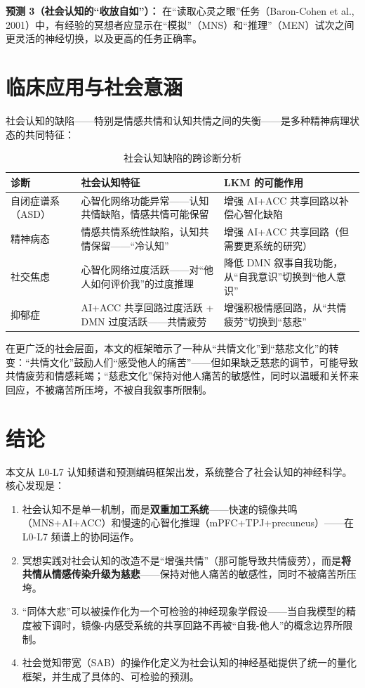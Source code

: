 \documentclass[UTF8,12pt,a4paper]{ctexart}
\begin{document}
\textbf{预测 3（社会认知的``收放自如''）：} 在``读取心灵之眼''任务（Baron-Cohen et al., 2001）中，有经验的冥想者应显示在``模拟''（MNS）和``推理''（MEN）试次之间更灵活的神经切换，以及更高的任务正确率。

\section{临床应用与社会意涵}

社会认知的缺陷——特别是情感共情和认知共情之间的失衡——是多种精神病理状态的共同特征：

\begin{table}[h]
\centering
\caption{社会认知缺陷的跨诊断分析}
\begin{tabular}{p{2.5cm}p{4.5cm}p{5.5cm}}
\toprule
\textbf{诊断} & \textbf{社会认知特征} & \textbf{LKM 的可能作用} \\
\midrule
自闭症谱系（ASD） & 心智化网络功能异常——认知共情缺陷，情感共情可能保留 & 增强 AI+ACC 共享回路以补偿心智化缺陷 \\
精神病态 & 情感共情系统性缺陷，认知共情保留——``冷认知'' & 增强 AI+ACC 共享回路（但需要更系统的研究） \\
社交焦虑 & 心智化网络过度活跃——对``他人如何评价我''的过度推理 & 降低 DMN 叙事自我功能，从``自我意识''切换到``他人意识'' \\
抑郁症 & AI+ACC 共享回路过度活跃 + DMN 过度活跃——共情疲劳 & 增强积极情感回路，从``共情疲劳''切换到``慈悲'' \\
\bottomrule
\end{tabular}
\end{table}

在更广泛的社会层面，本文的框架暗示了一种从``共情文化''到``慈悲文化''的转变：``共情文化''鼓励人们``感受他人的痛苦''——但如果缺乏慈悲的调节，可能导致共情疲劳和情感耗竭；``慈悲文化''保持对他人痛苦的敏感性，同时以温暖和关怀来回应，不被痛苦所压垮，不被自我叙事所限制。

\section{结论}

本文从 L0-L7 认知频谱和预测编码框架出发，系统整合了社会认知的神经科学。核心发现是：

\begin{enumerate}[nosep]
    \item 社会认知不是单一机制，而是\textbf{双重加工系统}——快速的镜像共鸣（MNS+AI+ACC）和慢速的心智化推理（mPFC+TPJ+precuneus）——在 L0-L7 频谱上的协同运作。
    \item 冥想实践对社会认知的改造不是``增强共情''（那可能导致共情疲劳），而是\textbf{将共情从情感传染升级为慈悲}——保持对他人痛苦的敏感性，同时不被痛苦所压垮。
    \item ``同体大悲''可以被操作化为一个可检验的神经现象学假设——当自我模型的精度被下调时，镜像-内感受系统的共享回路不再被``自我-他人''的概念边界所限制。
    \item 社会觉知带宽（SAB）的操作化定义为社会认知的神经基础提供了统一的量化框架，并生成了具体的、可检验的预测。
\end{enumerate}
\end{document}
